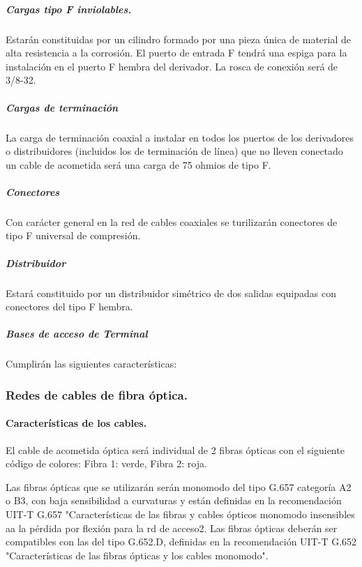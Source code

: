 \subparagraph{Cargas tipo F inviolables.}
Estarán constituidas por un cilindro formado por una pieza única de material de alta resistencia a la corrosión. El puerto de entrada F tendrá una espiga para la instalación en el puerto F hembra del derivador. La rosca de conexión será de 3/8-32.

\subparagraph{Cargas de terminación}
La carga de terminación coaxial a instalar en todos los puertos de los derivadores o distribuidores (incluidos los de terminación de línea) que no lleven conectado un cable de acometida será una carga de 75 ohmios de tipo F.

\subparagraph{Conectores}
Con carácter general en la red de cables coaxiales se turilizarán conectores de tipo F universal de compresión.

\subparagraph{Distribuidor}
Estará constituido por un distribuidor simétrico de dos salidas equipadas con conectores del tipo F hembra.

\subparagraph{Bases de acceso de Terminal}
Cumplirán las siguientes características:

\subsubsection{Redes de cables de fibra óptica.}
\paragraph{Características de los cables.}
El cable de acometida óptica será individual de 2 fibras ópticas con el siguiente código de colores: Fibra 1: verde, Fibra 2: roja.

Las fibras ópticas que se utilizarán serán monomodo del tipo G.657 categoría A2 o B3, con baja sensibilidad a curvaturas y están definidas en la recomendación UIT-T G.657 "Características de las fibras y cables ópticos monomodo insensibles aa la pérdida por flexión para la rd de acceso2. Las fibras ópticas deberán ser compatibles con las del tipo G.652.D, definidas en la recomendación UIT-T G.652 "Características de las fibras ópticas y los cables monomodo".

